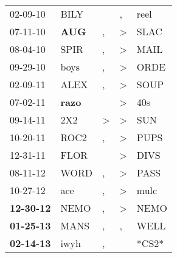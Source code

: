 \begin{supertabular}{p{0.07\textwidth}p{0.06\textwidth}p{0.02\textwidth}p{0.02\textwidth}p{0.06\textwidth}}
          02-09-10\textsuperscript{} &           BILY\textsuperscript{} &                  &                , &           reel\textsuperscript{} \\
          07-11-10\textsuperscript{} &   \textbf{AUG\textsuperscript{}} &                , &     \textgreater &           SLAC\textsuperscript{} \\
          08-04-10\textsuperscript{} &           SPIR\textsuperscript{} &                , &     \textgreater &           MAIL\textsuperscript{} \\
          09-29-10\textsuperscript{} &           boys\textsuperscript{} &                , &     \textgreater &           ORDE\textsuperscript{} \\
          02-09-11\textsuperscript{} &           ALEX\textsuperscript{} &                , &     \textgreater &           SOUP\textsuperscript{} \\
          07-02-11\textsuperscript{} &  \textbf{razo\textsuperscript{}} &                  &     \textgreater &            40s\textsuperscript{} \\
          09-14-11\textsuperscript{} &            2X2\textsuperscript{} &     \textgreater &     \textgreater &            SUN\textsuperscript{} \\
          10-20-11\textsuperscript{} &           ROC2\textsuperscript{} &                , &     \textgreater &           PUPS\textsuperscript{} \\
          12-31-11\textsuperscript{} &           FLOR\textsuperscript{} &                  &     \textgreater &           DIVS\textsuperscript{} \\
          08-11-12\textsuperscript{} &           WORD\textsuperscript{} &                , &     \textgreater &           PASS\textsuperscript{} \\
          10-27-12\textsuperscript{} &            ace\textsuperscript{} &                , &     \textgreater &           mulc\textsuperscript{} \\
 \textbf{12-30-12\textsuperscript{}} &           NEMO\textsuperscript{} &                , &     \textgreater &           NEMO\textsuperscript{} \\
 \textbf{01-25-13\textsuperscript{}} &           MANS\textsuperscript{} &                , &                , &           WELL\textsuperscript{} \\
 \textbf{02-14-13\textsuperscript{}} &           iwyh\textsuperscript{} &                , &                  &                            *CS2* \\

\end{supertabular}
